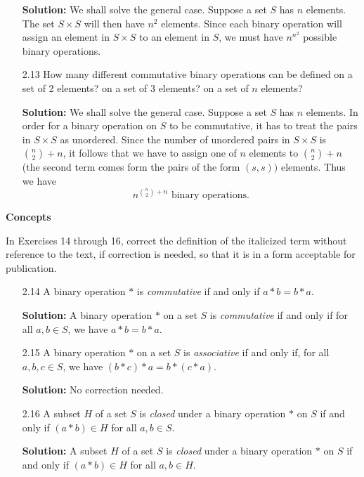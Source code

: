 \begin{enumerate}
      \textbf{Solution:} We shall solve the general case. Suppose a set $S$ has
      $n$ elements. The set $S \times S$ will then have $n^2$ elements. Since
      each binary operation will assign an element in $S \times S$ to an element
      in $S$, we must have $n^{n^2}$ possible binary operations.
   \item[2.13] How many different commutative binary operations can be defined 
               on a set of 2 elements? on a set of 3 elements? on a set of $n$
               elements?

      \textbf{Solution:} We shall solve the general case. Suppose a set $S$ has
      $n$ elements. In order for a binary operation on $S$ to be commutative, it
      has to treat the pairs in $S \times S$ as unordered. Since the number of
      unordered pairs in $S \times S$ is $\binom{n}{2} + n$, it follows that we 
      have to assign one of $n$ elements to $\binom{n}{2} + n$ (the second 
      term comes form the pairs of the form $(s, s))$ elements. Thus we have
      $$n^{\binom{n}{2} + n} \mbox{ binary operations}.$$

\end{enumerate}

\noindent \textbf{Concepts}

\noindent In Exercises 14 through 16, correct the definition of the italicized
          term without reference to the text, if correction is needed, so that
          it is in a form acceptable for publication.

\begin{enumerate}
   \item[2.14] A binary operation $*$ is \textit{commutative} if and only if
               $a * b = b * a$.

      \textbf{Solution:} A binary operation $*$ on a set $S$ is
      \textit{commutative} if and only if for all $a, b \in S$, we have
      $a * b = b * a$.
   \item[2.15] A binary operation $*$ on a set $S$ is \textit{associative} if
               and only if, for all $a, b, c \in S$, we have
               $(b * c) * a = b * (c * a)$.

      \textbf{Solution:} No correction needed.
   \item[2.16] A subset $H$ of a set $S$ is \textit{closed} under a binary
               operation $*$ on $S$ if and only if $(a * b) \in H$ for all
               $a, b \in S$.

      \textbf{Solution:} A subset $H$ of a set $S$ is \textit{closed} under a 
      binary operation $*$ on $S$ if and only if $(a * b) \in H$ for all
      $a, b \in H$.
\end{enumerate}

